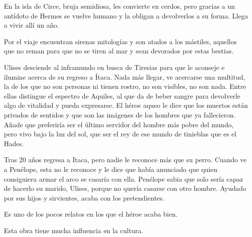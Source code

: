 En la isla de Circe, bruja semidiosa, les convierte en cerdos, pero gracias a un antídoto de Hermes se vuelve humano y la obligan a devolverlos a su forma. Llega a vivir allí un año.

Por el viaje encuentran sirenas mitologías y son atados a los mástiles, aquellos que no reman para que no se tiren al mar y sean devorados por estas bestias.

Ulises desciende al inframundo en busca de Tiresias para que le aconseje e ilumine acerca de su regreso a Ítaca. Nada más llegar, ve acercarse una multitud, la de los que no son personas ni tienen rostro, no son visibles, no son nada. Entre ellas distingue el espectro de Aquiles, al que da de beber sangre para devolverle algo de vitalidad y pueda expresarse. El héroe aqueo le dice que los muertos están privados de sentidos y que son las imágenes de los hombres que ya fallecieron. Añade que preferiría ser el último servidor del hombre más pobre del mundo, pero vivo bajo la luz del sol, que ser el rey de ese mundo de tinieblas que es el Hades.

Tras 20 años regresa a Itaca, pero nadie le reconoce más que su perro. Cuando ve a Penélope, esta no le reconoce y le dice que había anunciado que quien consiguiera armar el arco se casaría con ella. Penélope sabia que solo sería capaz de hacerlo su marido, Ulises, porque no quería casarse con otro hombre. Ayudado por sus hijos y sirvientes, acaba con los pretendientes.

Es uno de los pocos relatos en los que el héroe acaba bien.

Esta obra tiene mucha influencia en la cultura.